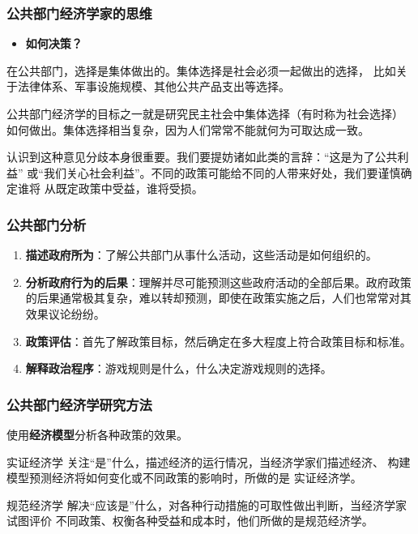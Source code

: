 \documentclass[aspectratio=169, 12pt]{beamer}
\begin{document}
\begin{frame}[plain]
    \frametitle{公共部门经济学家的思维}
    \begin{itemize}
        \item \textbf{如何决策？}
    \end{itemize}
    在公共部门，选择是集体做出的。集体选择是社会必须一起做出的选择，
    比如关于法律体系、军事设施规模、其他公共产品支出等选择。
    \par
    公共部门经济学的目标之一就是研究民主社会中集体选择（有时称为社会选择）
    如何做出。集体选择相当复杂，因为人们常常不能就何为可取达成一致。
    \par
    认识到这种意见分歧本身很重要。我们要提妨诸如此类的言辞：“这是为了公共利益”
    或“我们关心社会利益”。不同的政策可能给不同的人带来好处，我们要谨慎确定谁将
    从既定政策中受益，谁将受损。
\end{frame}

\begin{frame}[plain]
    \frametitle{公共部门分析} 
    \begin{enumerate}
        \item \textbf{描述政府所为}：了解公共部门从事什么活动，这些活动是如何组织的。
        \item \textbf{分析政府行为的后果}：理解并尽可能预测这些政府活动的全部后果。政府政策的后果通常极其复杂，难以转却预测，即使在政策实施之后，人们也常常对其效果议论纷纷。
        \item \textbf{政策评估}：首先了解政策目标，然后确定在多大程度上符合政策目标和标准。
        \item \textbf{解释政治程序}：游戏规则是什么，什么决定游戏规则的选择。
    \end{enumerate}
\end{frame}

\begin{frame}[plain]
    \frametitle{公共部门经济学研究方法} 
    使用\textbf{经济模型}分析各种政策的效果。
    \begin{block}{实证经济学}
        关注“是”什么，描述经济的运行情况，当经济学家们描述经济、
        构建模型预测经济将如何变化或不同政策的影响时，所做的是
        实证经济学。
    \end{block}
    \begin{block}{规范经济学}
        解决“应该是”什么，对各种行动措施的可取性做出判断，当经济学家试图评价
        不同政策、权衡各种受益和成本时，他们所做的是规范经济学。
    \end{block}
\end{frame}
\end{document}
